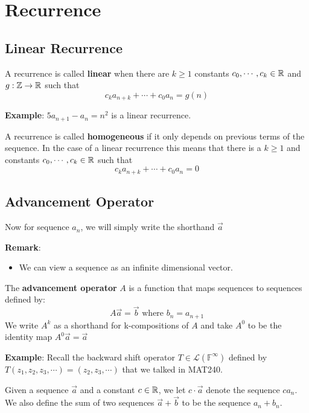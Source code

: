 \chapter{Recurrence}

\section{Linear Recurrence}

\begin{definition}
    A recurrence is called \textbf{linear} when there are $k \geq 1$ constants $c_0, \cdots ,c_k \in \mathbb{R}$ and $g:\mathbb{Z} \rightarrow \mathbb{R}$ such that
    $$c_ka_{n+k}+ \cdots +c_0a_n=g(n)$$
\end{definition}
\noindent \textbf{Example}: $5a_{n+1}-a_n=n^2$ is a linear recurrence.

\begin{definition}
    A recurrence is called \textbf{homogeneous} if it only depends on previous terms of the sequence. 
    In the case of a linear recurrence this means that there is a $k \geq 1$ and constants $c_0, \cdots ,c_k \in \mathbb{R}$ such that 
    $$c_ka_{n+k}+ \cdots +c_0a_n=0$$
\end{definition}


\section{Advancement Operator}
\begin{definition}
    Now for sequence $a_n$, we will simply write the shorthand $\vec{a}$
\end{definition}
\textbf{Remark}:
\begin{itemize}
    \item We can view a sequence as an infinite dimensional vector.
\end{itemize}

\begin{definition}
    The \textbf{advancement operator} $A$ is a function that maps sequences to sequences defined by:
    $$A\vec{a}=\vec{b} \text{ where } b_n=a_{n+1}$$
    We write $A^k$ as a shorthand for k-compositions of $A$ and take $A^0$ to be the identity map $A^0\vec{a}=\vec{a}$
\end{definition}
\noindent \textbf{Example}: Recall the backward shift operator $T \in \mathcal{L}(\mathbb{F}^{\infty})$ defined by $T(z_1,z_2,z_3, \cdots)=(z_2,z_3, \cdots)$ that we talked in MAT240.

\begin{definition}
    Given a sequence $\vec{a}$ and a constant $c \in \mathbb{R}$, we let $c \cdot \vec{a}$ denote the sequence $ca_n$. 
    We also define the sum of two sequences $\vec{a}+\vec{b}$ to be the sequence $a_n+b_n$.
\end{definition}

